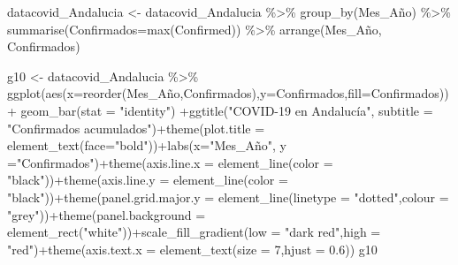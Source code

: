 \documentclass[
]{book}
\newenvironment{Shaded}{\begin{snugshade}}{\end{snugshade}}
\newcommand{\AttributeTok}[1]{\textcolor[rgb]{0.77,0.63,0.00}{#1}}
\newcommand{\DecValTok}[1]{\textcolor[rgb]{0.00,0.00,0.81}{#1}}
\newcommand{\FloatTok}[1]{\textcolor[rgb]{0.00,0.00,0.81}{#1}}
\newcommand{\FunctionTok}[1]{\textcolor[rgb]{0.00,0.00,0.00}{#1}}
\newcommand{\NormalTok}[1]{#1}
\newcommand{\OtherTok}[1]{\textcolor[rgb]{0.56,0.35,0.01}{#1}}
\newcommand{\SpecialCharTok}[1]{\textcolor[rgb]{0.00,0.00,0.00}{#1}}
\newcommand{\StringTok}[1]{\textcolor[rgb]{0.31,0.60,0.02}{#1}}
\begin{document}
\begin{Shaded}
\begin{Highlighting}[]
\NormalTok{ datacovid\_Andalucia }\OtherTok{\textless{}{-}}\NormalTok{ datacovid\_Andalucia }\SpecialCharTok{\%\textgreater{}\%} \FunctionTok{group\_by}\NormalTok{(Mes\_Año) }\SpecialCharTok{\%\textgreater{}\%} \FunctionTok{summarise}\NormalTok{(}\AttributeTok{Confirmados=}\FunctionTok{max}\NormalTok{(Confirmed)) }\SpecialCharTok{\%\textgreater{}\%} \FunctionTok{arrange}\NormalTok{(Mes\_Año, Confirmados)}
 
\NormalTok{ g10 }\OtherTok{\textless{}{-}}\NormalTok{ datacovid\_Andalucia }\SpecialCharTok{\%\textgreater{}\%}
     \FunctionTok{ggplot}\NormalTok{(}\FunctionTok{aes}\NormalTok{(}\AttributeTok{x=}\FunctionTok{reorder}\NormalTok{(Mes\_Año,Confirmados),}\AttributeTok{y=}\NormalTok{Confirmados,}\AttributeTok{fill=}\NormalTok{Confirmados)) }\SpecialCharTok{+}  \FunctionTok{geom\_bar}\NormalTok{(}\AttributeTok{stat =} \StringTok{"identity"}\NormalTok{) }\SpecialCharTok{+}\FunctionTok{ggtitle}\NormalTok{(}\StringTok{"COVID{-}19 en Andalucía"}\NormalTok{, }\AttributeTok{subtitle =} \StringTok{"Confirmados acumulados"}\NormalTok{)}\SpecialCharTok{+}\FunctionTok{theme}\NormalTok{(}\AttributeTok{plot.title =} \FunctionTok{element\_text}\NormalTok{(}\AttributeTok{face=}\StringTok{"bold"}\NormalTok{))}\SpecialCharTok{+}\FunctionTok{labs}\NormalTok{(}\AttributeTok{x=}\StringTok{"Mes\_Año"}\NormalTok{, }\AttributeTok{y =}\StringTok{"Confirmados"}\NormalTok{)}\SpecialCharTok{+}\FunctionTok{theme}\NormalTok{(}\AttributeTok{axis.line.x =} \FunctionTok{element\_line}\NormalTok{(}\AttributeTok{color =} \StringTok{"black"}\NormalTok{))}\SpecialCharTok{+}\FunctionTok{theme}\NormalTok{(}\AttributeTok{axis.line.y =} \FunctionTok{element\_line}\NormalTok{(}\AttributeTok{color =} \StringTok{"black"}\NormalTok{))}\SpecialCharTok{+}\FunctionTok{theme}\NormalTok{(}\AttributeTok{panel.grid.major.y =} \FunctionTok{element\_line}\NormalTok{(}\AttributeTok{linetype =} \StringTok{"dotted"}\NormalTok{,}\AttributeTok{colour =} \StringTok{"grey"}\NormalTok{))}\SpecialCharTok{+}\FunctionTok{theme}\NormalTok{(}\AttributeTok{panel.background =} \FunctionTok{element\_rect}\NormalTok{(}\StringTok{"white"}\NormalTok{))}\SpecialCharTok{+}\FunctionTok{scale\_fill\_gradient}\NormalTok{(}\AttributeTok{low =} \StringTok{"dark red"}\NormalTok{,}\AttributeTok{high =} \StringTok{"red"}\NormalTok{)}\SpecialCharTok{+}\FunctionTok{theme}\NormalTok{(}\AttributeTok{axis.text.x =} \FunctionTok{element\_text}\NormalTok{(}\AttributeTok{size =} \DecValTok{7}\NormalTok{,}\AttributeTok{hjust =} \FloatTok{0.6}\NormalTok{))}
\NormalTok{g10}
\end{Highlighting}
\end{Shaded}
\end{document}
